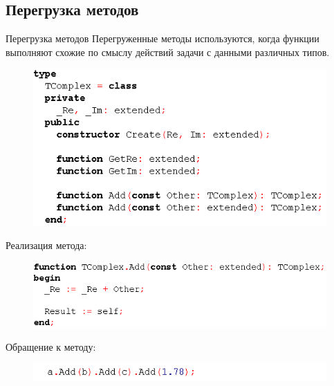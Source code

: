 \documentclass{beamer}
\begin{document}
\subsection{Перегрузка методов}
\begin{frame}{Перегрузка методов}
Перегруженные методы используются, когда функции выполняют схожие по смыслу действий задачи с данными различных типов.
\begin{figure}[h]
\centering
\includegraphics[scale=0.4]{images/lec06-pic04.png}
\end{figure}
Реализация метода:
\begin{figure}[h]
\centering
\includegraphics[scale=0.4]{images/lec06-pic05.png}
\end{figure}
Обращение к методу:
\begin{figure}[h]
\centering
\includegraphics[scale=0.4]{images/lec06-pic06.png}
\end{figure}
\end{frame}
\end{document}
